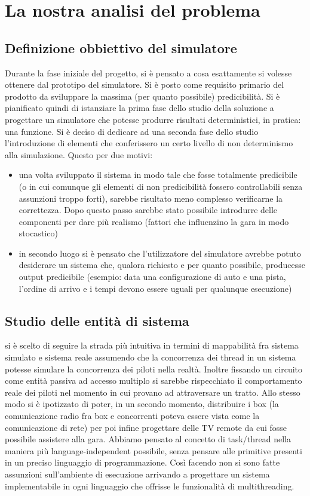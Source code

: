 \section{La nostra analisi del problema}
\subsection{Definizione obbiettivo del simulatore}
Durante la fase iniziale del progetto, si è pensato a cosa esattamente si volesse ottenere dal prototipo del simulatore. Si è posto come requisito primario del prodotto da sviluppare la massima (per quanto possibile) predicibilità. Si è pianificato quindi di istanziare la prima fase dello studio della soluzione a progettare un simulatore che potesse produrre risultati deterministici, in pratica: una funzione. Si è deciso di dedicare ad una seconda fase dello studio l’introduzione di elementi che conferissero un certo livello di non determinismo alla simulazione. Questo per due motivi:
\begin{itemize}
               \item una volta sviluppato il sistema in modo tale che fosse totalmente predicibile (o in cui comunque gli elementi di non predicibilità fossero controllabili senza assunzioni troppo forti), sarebbe risultato meno complesso verificarne la correttezza. Dopo questo passo sarebbe stato possibile introdurre delle componenti per dare più realismo (fattori che influenzino la gara in modo stocastico)
                \item in secondo luogo si è pensato che l’utilizzatore del simulatore avrebbe potuto desiderare un sistema che, qualora richiesto e per quanto possibile, producesse output predicibile (esempio: data una configurazione di auto e una pista, l’ordine di arrivo e i tempi devono essere uguali per qualunque esecuzione)
\end{itemize}
\subsection{Studio delle entità di sistema}
si è scelto di seguire la strada più intuitiva in termini di mappabilità fra sistema simulato e sistema reale assumendo che la concorrenza dei thread in un sistema potesse simulare la concorrenza dei piloti nella realtà. Inoltre fissando un circuito come entità passiva ad accesso multiplo si sarebbe rispecchiato il comportamento reale dei piloti nel momento in cui provano ad attraversare un tratto. Allo stesso modo si è ipotizzato di poter, in un secondo momento, distribuire i box (la comunicazione radio fra box e concorrenti poteva essere vista come la comunicazione di rete) per poi infine progettare delle TV remote da cui fosse possibile assistere alla gara.
Abbiamo pensato al concetto di task/thread nella maniera più language-independent possibile, senza pensare alle primitive presenti in un preciso linguaggio di programmazione. Così facendo non si sono fatte assunzioni sull'ambiente di esecuzione arrivando a progettare un sistema implementabile in ogni linguaggio che offrisse le funzionalità di multithreading.
